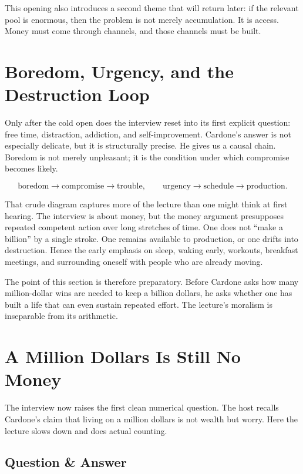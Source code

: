 This opening also introduces a second theme that will return later: if the relevant pool is enormous, then the problem is not merely accumulation. It is access. Money must come through channels, and those channels must be built.

\section{Boredom, Urgency, and the Destruction Loop}

Only after the cold open does the interview reset into its first explicit question: free time, distraction, addiction, and self-improvement. Cardone's answer is not especially delicate, but it is structurally precise. He gives us a causal chain. Boredom is not merely unpleasant; it is the condition under which compromise becomes likely.

\begin{equation}
\text{boredom} \to \text{compromise} \to \text{trouble},
\qquad
\text{urgency} \to \text{schedule} \to \text{production}.
\end{equation}

That crude diagram captures more of the lecture than one might think at first hearing. The interview is about money, but the money argument presupposes repeated competent action over long stretches of time. One does not ``make a billion'' by a single stroke. One remains available to production, or one drifts into destruction. Hence the early emphasis on sleep, waking early, workouts, breakfast meetings, and surrounding oneself with people who are already moving.

The point of this section is therefore preparatory. Before Cardone asks how many million-dollar wins are needed to keep a billion dollars, he asks whether one has built a life that can even sustain repeated effort. The lecture's moralism is inseparable from its arithmetic.

\section{A Million Dollars Is Still No Money}

The interview now raises the first clean numerical question. The host recalls Cardone's claim that living on a million dollars is not wealth but worry. Here the lecture slows down and does actual counting.

\subsection{Question \& Answer}

